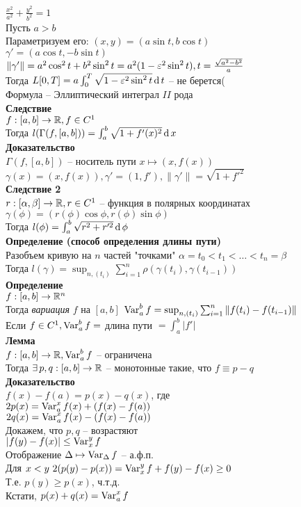 \documentclass[12pt]{article}
\begin{document}
$\frac{x^2}{a^2} + \frac{y^2}{b^2}=1$\\
Пусть $a > b$\\
Параметризуем его: $(x, y) = (a\sin t, b\cos t)$\\
$\gamma' = (a\cos t, -b\sin t)$\\
$\|\gamma'\| = a^2\cos^2 t + b^2 \sin^2 t = a^2(1 -\varepsilon^2 \sin^2 t), t = \frac{\sqrt{a^2 - b^2}}{a}$\\
Тогда $L[0,T] = a\int_0^T\sqrt{1-\varepsilon^2 \sin^2 t}\operatorname{d} t$ -- не берется(\\
Формула -- Эллиптический интеграл $II$ рода\\
\textbf{Следствие}\\
$f:[a,b] \rightarrow \mathbb{R}, f\in C^1$\\
Тогда $l(\Gamma(f, [a,b])) = \int_a^b \sqrt{1 + f'(x)^2}\operatorname{d} x$\\
\textbf{Доказательство}\\
$\Gamma(f, [a,b])$ -- носитель пути $x \mapsto (x, f(x))$\\
$\gamma(x) = (x, f(x)), \gamma'=(1,f'), \|\gamma'\| = \sqrt{1 + f'^2}$\\
\textbf{Следствие 2}\\
$r: [\alpha, \beta] \rightarrow \mathbb{R}, r \in C^1$ -- функция в полярных координатах\\
$\gamma(\phi) = (r(\phi)\cos \phi, r(\phi)\sin\phi)$\\
Тогда $l(\phi) = \int_a^b \sqrt{r^2 + r'^2}\operatorname{d} \phi$\\
\textbf{Определение (способ определения длины пути)}\\
Разобъем кривую на $n$ частей "точками" $\alpha = t_0 < t_1 < \ldots < t_n = \beta$\\
Тогда $l(\gamma) = \sup_{n, (t_i)} \sum_{i=1}^n \rho(\gamma(t_i), \gamma(t_{i-1}))$\\
\textbf{Определение}\\
$f:[a, b] \rightarrow \mathbb{R}^n$\\
Тогда \textit{вариация} $f$ на $[a,b]$ $\operatorname{Var}_a^b f = \sup_{n, (t_i)} \sum_{i=1}^n \|f(t_i)-f(t_{i-1})\|$\\
Если $f \in C^1, \operatorname{Var}_a^b f = $ длина пути $ = \int_a^b |f'|$\\
\textbf{Лемма}\\
$f:[a,b] \rightarrow \mathbb{R}, \operatorname{Var}_a^b f$ -- ограничена\\
Тогда $\exists\, p,q: [a,b]\rightarrow \mathbb{R}$ -- монотонные такие, что $f\equiv p-q$\\
\textbf{Доказательство}\\
$f(x)-f(a)=p(x)-q(x)$, где\\
$2p(x) = \operatorname{Var}_a^x f(x)+(f(x)-f(a))$\\
$2q(x) = \operatorname{Var}_a^x f(x) - (f(x) - f(a))$\\
Докажем, что $p,q$ -- возрастяют\\
$|f(y)-f(x)| \leq \operatorname{Var}_x^y f$\\
Отображение $\Delta \mapsto \operatorname{Var}_\Delta f$ -- а.ф.п.\\
Для $x < y\ 2(p(y)-p(x))=\operatorname{Var}_x^y f + f(y)-f(x) \geq 0$\\
Т.е. $p(y) \geq p(x)$, ч.т.д.\\
Кстати, $p(x) + q(x) = \operatorname{Var}_a^x f$\\
\end{document}
